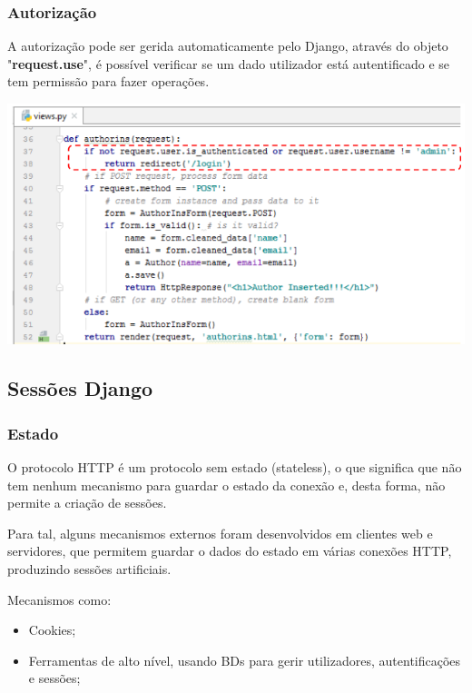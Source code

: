 \documentclass{article}
\begin{document}
\pagebreak

\subsubsection{Autorização}

\begin{flushleft}
  A autorização pode ser gerida automaticamente pelo Django, através
  do objeto "\textbf{request.use}", é possível verificar se um dado
  utilizador está autentificado e se tem permissão para fazer operações.

  \begin{center}
    \includegraphics[scale=0.35]{26}
  \end{center}
\end{flushleft}

\subsection{Sessões Django}

\subsubsection{Estado}

\begin{flushleft}
  O protocolo HTTP é um protocolo sem estado (stateless), o que significa
  que não tem nenhum mecanismo para guardar o estado da conexão e, desta forma,
  não permite a criação de sessões.

  \vspace{2mm}

  Para tal, alguns mecanismos externos foram desenvolvidos em clientes web e
  servidores, que permitem guardar o dados do estado em várias conexões HTTP,
  produzindo sessões artificiais.

  \vspace{2mm}
  Mecanismos como:
  \begin{itemize}
    \item Cookies;
    \item Ferramentas de alto nível, usando BDs para gerir utilizadores,
    autentificações e sessões;
  \end{itemize}
\end{flushleft}
\end{document}

